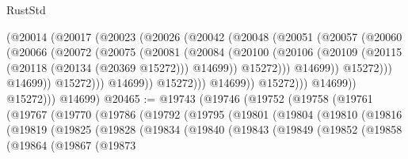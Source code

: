 \begin{lexlean}{RustStd}
\begin{coremodule}
                              (@20014
                                (@20017
                                  (@20023
                                    (@20026
                                      (@20042
                                        (@20048
                                          (@20051
                                            (@20057
                                              (@20060
                                                (@20066
                                                  (@20072
                                                    (@20075
                                                      (@20081
                                                        (@20084
                                                          (@20100
                                                            (@20106
                                                              (@20109
                                                                (@20115
                                                                  (@20118 (@20134 (@20369 @15272)))
                                                                  @14699))
                                                              @15272)))
                                                        @14699))
                                                    @15272)))
                                              @14699))
                                          @15272)))
                                    @14699))
                                @15272)))
                          @14699))
                      @15272)))
                @14699))
            @15272)))
      @14699)
@20465 := @19743
    (@19746
      (@19752
        (@19758
          (@19761
            (@19767
              (@19770
                (@19786
                  (@19792
                    (@19795
                      (@19801
                        (@19804
                          (@19810
                            (@19816
                              (@19819
                                (@19825
                                  (@19828
                                    (@19834
                                      (@19840
                                        (@19843
                                          (@19849
                                            (@19852
                                              (@19858
                                                (@19864
                                                  (@19867
                                                    (@19873

\end{coremodule}
\end{lexlean}
